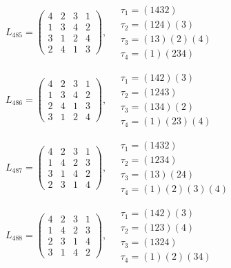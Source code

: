 $L_{485} = \begin{pmatrix} 4 & 2 & 3 & 1 \\ 1 & 3 & 4 & 2 \\ 3 & 1 & 2 & 4 \\ 2 & 4 & 1 & 3 \end{pmatrix}, \quad \begin{matrix} \tau_{1} = (1 4 3 2) \\ \tau_{2} = (1 2 4)(3) \\ \tau_{3} = (1 3)(2)(4) \\ \tau_{4} = (1)(2 3 4) \end{matrix}$

$L_{486} = \begin{pmatrix} 4 & 2 & 3 & 1 \\ 1 & 3 & 4 & 2 \\ 2 & 4 & 1 & 3 \\ 3 & 1 & 2 & 4 \end{pmatrix}, \quad \begin{matrix} \tau_{1} = (1 4 2)(3) \\ \tau_{2} = (1 2 4 3) \\ \tau_{3} = (1 3 4)(2) \\ \tau_{4} = (1)(2 3)(4) \end{matrix}$

$L_{487} = \begin{pmatrix} 4 & 2 & 3 & 1 \\ 1 & 4 & 2 & 3 \\ 3 & 1 & 4 & 2 \\ 2 & 3 & 1 & 4 \end{pmatrix}, \quad \begin{matrix} \tau_{1} = (1 4 3 2) \\ \tau_{2} = (1 2 3 4) \\ \tau_{3} = (1 3)(2 4) \\ \tau_{4} = (1)(2)(3)(4) \end{matrix}$

$L_{488} = \begin{pmatrix} 4 & 2 & 3 & 1 \\ 1 & 4 & 2 & 3 \\ 2 & 3 & 1 & 4 \\ 3 & 1 & 4 & 2 \end{pmatrix}, \quad \begin{matrix} \tau_{1} = (1 4 2)(3) \\ \tau_{2} = (1 2 3)(4) \\ \tau_{3} = (1 3 2 4) \\ \tau_{4} = (1)(2)(3 4) \end{matrix}$

